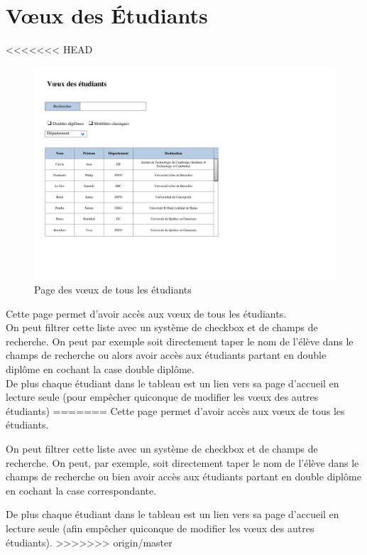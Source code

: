 \section{Vœux des Étudiants}
\label{sec::stud_wish}
<<<<<<< HEAD

\begin{figure}[H]
	\includegraphics[scale=0.8]{Etudiant/VoeuxEtudiants.pdf}
	\caption{Page des vœux de tous les étudiants}
\end{figure}

Cette page permet d'avoir accès aux vœux de tous les étudiants.\\
On peut filtrer cette liste avec un système de checkbox et de champs de recherche. On peut par exemple soit directement taper le nom de l'élève dans le champs de recherche ou alors avoir accès aux étudiants partant en double diplôme en cochant la case double diplôme.\\
De plus chaque étudiant dans le tableau est un lien vers sa page d'accueil en lecture seule (pour empêcher quiconque de modifier les vœux des autres étudiants)
=======
Cette page permet d'avoir accès aux vœux de tous les étudiants.

On peut filtrer cette liste avec un système de checkbox et de champs de recherche. On peut, par exemple, soit directement taper le nom de l'élève dans le champs de recherche ou bien avoir accès aux étudiants partant en double diplôme en cochant la case correspondante.

De plus chaque étudiant dans le tableau est un lien vers sa page d'accueil en lecture seule (afin empêcher quiconque de modifier les vœux des autres étudiants).
>>>>>>> origin/master
